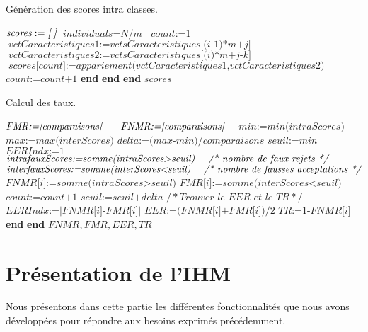 \begin{algorithm}[H]
	\caption{Génération des scores intra classes.}\label{intra}
	\begin{algorithmic}[1]
		\State $\textit{scores}:=\textit{[\;]}$
		\State $\textit{individuals}=\textit{N/m}$
		\State $\textit{count}:=\textit{1}$
		\State$\textit{vctCaracteristiques1}:=\textit{vctsCaracteristiques[(i-1)*m+j]}$
		\State $\textit{vctCaracteristiques2}:=\textit{vctsCaracteristiques[(i)*m+j-k]}$
		\State $\textit{scores[count]}:= \textit{appariement(vctCaracteristiques1,vctCaracteristiques2)}$
		\State $\textit{count:=count+1}$
		\EndFor
		\State \textbf{end}
		\EndFor
		\State \textbf{end}
		\EndFor
		\State \textbf{end}
		\State \Return $scores$
		\EndFunction
	\end{algorithmic}
\end{algorithm}



\begin{algorithm}[H]
	\caption{Calcul des taux.}\label{euclid}
	\begin{algorithmic}[1]
		\State $\textit{FMR:=[comparaisons] \quad}$
		\State $\textit{FNMR:=[comparaisons]\quad }$
		\State $\textit{min:=min(intraScores)}$
		\State $\textit{max:=max(interScores)}$
		\State $\textit{delta:=(max-min)/comparaisons} $
		\State $\textit{seuil:=min }$
		\State $\textit{EERIndx:=1 }$
		\State$\textit{intrafauxScores:=somme(intraScores>seuil) \quad /* nombre de faux rejets */}$
		\State$\textit{interfauxScores:=somme(interScores<seuil) \quad /* nombre de fausses acceptations */}$
		\State$\textit{FNMR[i]:=somme(intraScores>seuil)}$
		\State$\textit{FMR[i]:=somme(interScores<seuil)}$
		\State$\textit{count:=count+1}$
		\State$\textit{seuil:=seuil+delta}$
		\State $/*\textit{Trouver le EER et le TR}*/$
		\State$\textit{EERIndx:=|FNMR[i]-FMR[i]|}$
		\State$\textit{EER:=(FNMR[i]+FMR[i])/2}$
		\State$\textit{TR:=1-FNMR[i]}$
		\EndIf
		\State \textbf{end} 
		\EndFor
		\State \textbf{end} 
		\State \Return $FNMR,FMR,EER,TR$
		\EndFunction
	\end{algorithmic}
\end{algorithm}


\section{Présentation de l'IHM}	
Nous présentons dans cette partie les différentes fonctionnalités que nous avons développées pour répondre aux besoins exprimés précédemment.

